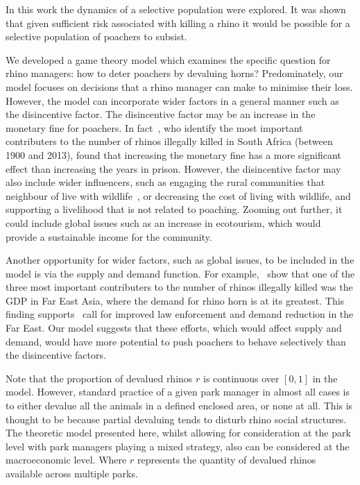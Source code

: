 \documentclass[10pt]{article}
\begin{document}
In this work the dynamics of a selective population were explored. It was shown
that given sufficient risk associated with killing a rhino it would be possible
for a selective population of poachers to subsist.

We developed a game theory model which examines the specific question for rhino managers:
how to deter poachers by devaluing horns? Predominately, our model focuses on decisions
that a rhino manager can make to minimise their loss. However, the model can incorporate
wider factors in a general manner such as the disincentive factor. The disincentive factor
may be an increase in the monetary fine for poachers. In fact~\cite{di2015identification},
who identify the most important contributers to the number of rhinos illegally killed
in South Africa (between 1900 and 2013), found that increasing the monetary fine has
a more significant effect than increasing the years in prison. However, the disincentive
factor may also include wider influencers, such as engaging the rural communities that
neighbour of live with wildlife~\cite{Duan2013}, or decreasing the cost of living with wildlife,
and supporting a livelihood that is not related to poaching. Zooming out further,
it could include global issues such as an increase in ecotourism, which would
provide a sustainable income for the community.

Another opportunity for wider factors, such as global issues, to be included in
the model is via the supply and demand function. For example,~\cite{di2015identification}
show that one of the three most important contributers to the number of rhinos illegally
killed was the GDP in Far East Asia, where the demand for rhino horn is at its greatest.
This finding supports~\cite{lawson2014global} call for improved law enforcement and
demand reduction in the Far East. Our model suggests that these efforts, which
would affect supply and demand, would have more potential to push poachers to
behave selectively than the disincentive factors.

Note that the proportion of devalued rhinos \(r\) is continuous over \([0, 1]\)
in the model. However, standard practice of a given park manager in almost all
cases is to either devalue all the animals in a defined enclosed area, or none
at all. This is thought to be because partial devaluing tends to disturb
rhino social structures. The theoretic model presented here, whilst allowing for
consideration at the park level with park managers playing a mixed strategy, also
can be considered at the macroeconomic level. Where \(r\) represents the quantity
of devalued rhinos available across multiple parks.
\end{document}
